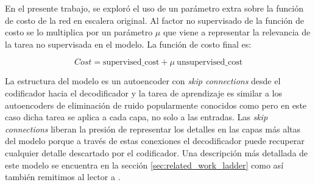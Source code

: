 En el presente trabajo, se exploró el uso de un parámetro extra sobre la función de costo de la red en escalera original. Al factor no supervisado de la función de costo se lo multiplica por un parámetro $\mu$ que viene a representar la relevancia de la tarea no supervisada en el modelo. La función de costo final es:

\[
Cost = \text{supervised\_cost} + \mu ~ \text{unsupervised\_cost}
\]

La estructura del modelo es un autoencoder con \textit{skip connections} desde el codificador hacia 
el decodificador y la tarea de aprendizaje es similar a los autoencoders de eliminación de ruido popularmente 
conocidos como  pero en este caso dicha tarea se aplica a cada capa, no solo a 
las entradas. Las \textit{skip connections} liberan la presión de representar  los detalles en las capas más 
altas del modelo porque a través de estas conexiones el decodificador puede recuperar cualquier detalle 
descartado por el codificador. Una descripción más detallada de este modelo se encuentra en la sección 
\ref{sec:related_work_ladder} como así también remitimos al lector a \cite{DBLP:journals/corr/RasmusVHBR15}.